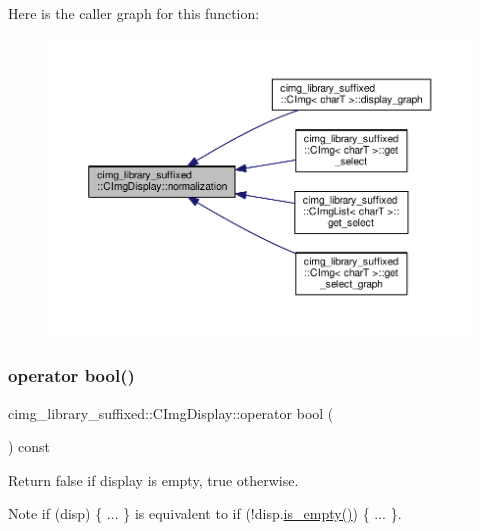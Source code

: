 Here is the caller graph for this function\+:
\nopagebreak
\begin{figure}[H]
\begin{center}
\leavevmode
\includegraphics[width=350pt]{d5/d53/structcimg__library__suffixed_1_1CImgDisplay_a79b6f929fe4aaf411051fc85862191a7_icgraph}
\end{center}
\end{figure}
\mbox{\label{structcimg__library__suffixed_1_1CImgDisplay_a61454bcb46ac5620760e9488b5819ecd}} 
\subsubsection{\texorpdfstring{operator bool()}{operator bool()}}
{\footnotesize\ttfamily cimg\+\_\+library\+\_\+suffixed\+::\+C\+Img\+Display\+::operator bool (\begin{DoxyParamCaption}{ }\end{DoxyParamCaption}) const\hspace{0.3cm}{\ttfamily [inline]}}



Return {\ttfamily false} if display is empty, {\ttfamily true} otherwise. 

\begin{DoxyNote}{Note}
{\ttfamily if (disp) \{ ... \}} is equivalent to {\ttfamily if (!disp.\hyperlink{structcimg__library__suffixed_1_1CImgDisplay_ac16a92c12938405d33d489cb70a7ac06}{is\+\_\+empty()}) \{ ... \}}. 
\end{DoxyNote}


